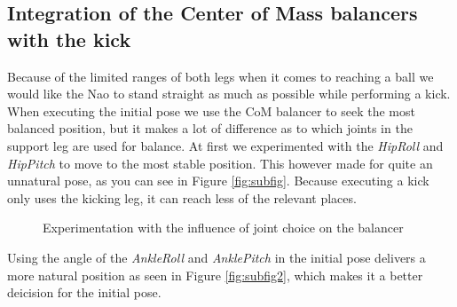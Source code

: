 \documentclass[a4paper]{article}
\begin{document}
\subsection{Integration of the Center of Mass balancers with the kick}
Because of the limited ranges of both legs when it comes to reaching a ball we
would like the Nao to stand straight as much as possible while performing a kick. 
When executing the initial pose we use the CoM balancer to seek the most
balanced position, but it makes a lot of difference as to which joints in the
support leg are used for balance. At first we experimented  with the
\emph{HipRoll} and \emph{HipPitch} to move to the most stable position. This
however made for quite an unnatural pose, as you can see in Figure
\ref{fig:subfig}. Because executing a kick only uses the kicking leg, it can
reach less of the relevant places. 

\begin{figure}[ht]
\centering



\label{myfigure}
\caption{Experimentation with the influence of joint choice on the balancer}
\end{figure}
Using the angle of the \emph{AnkleRoll} and \emph{AnklePitch} in the initial
pose delivers a more natural position as seen in Figure \ref{fig:subfig2},
which makes it a better deicision for the initial pose. 
\end{document}
